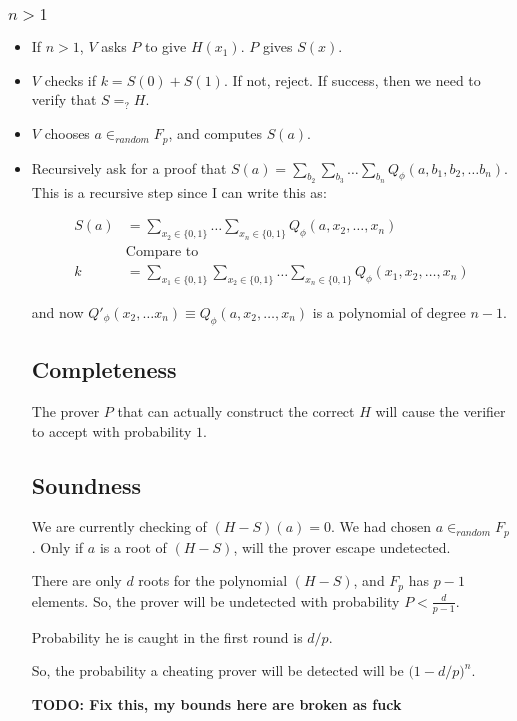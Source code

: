 \subsubsection{$n > 1$}
\begin{itemize}
\item If $n > 1$, $V$ asks $P$ to give $H(x_1)$. $P$ gives $S(x)$.

\item $V$ checks if $k = S(0) + S(1)$. If not, reject. If success, then we need
to verify that $S =_? H$.

\item $V$ chooses $a \in_{random} F_p$, and computes $S(a)$.

\item Recursively ask for a proof that $S(a) = \sum_{b_2} \sum_{b_3} \dots \sum_{b_n} Q_\phi(a, b_1, b_2, \dots b_n)$.
This is a recursive step since I can write this as:

\begin{align*}
S(a) &= 
     \sum_{x_2 \in \{0, 1\}} \dots \sum_{x_n \in \{0, 1\}}
    Q_\phi(a, x_2, \dots, x_n) \\
    &\text{Compare to} \\
k &= 
    \sum_{x_1 \in \{0, 1\}} \sum_{x_2 \in \{0, 1\}} \dots \sum_{x_n \in \{0, 1\}}
    Q_\phi(x_1, x_2, \dots, x_n)
\end{align*}

and now $Q'_\phi(x_2, \dots x_n) \equiv Q_\phi(a, x_2, \dots, x_n)$ is a polynomial
of degree $n - 1$.


\subsection{Completeness}
The prover $P$ that can actually construct the correct $H$ will cause the verifier
to accept with probability $1$.

\subsection{Soundness}
We are currently checking of $(H - S)(a) = 0$. We had chosen $a \in_{random} F_p$.
Only if $a$ is a root of $(H - S)$, will the prover escape undetected.

There are only $d$ roots for the polynomial $(H - S)$, and $F_p$ has $p - 1$
elements. So, the prover will be undetected with probability $P < \frac{d}{p - 1}$.

Probability he is caught in the first round is $d/p$. 

So, the probability a cheating prover will be detected will be $\big(1 - d/p\big)^{n}$.

\textbf{TODO: Fix this, my bounds here are broken as fuck}
\end{itemize}

